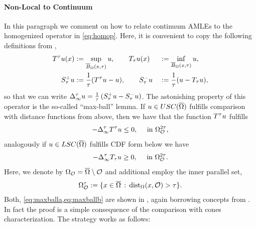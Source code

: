 \paragraph{Non-Local to Continuum}
%
In this paragraph we comment on how to relate continuum AMLEs to the homogenized operator in \cref{eq:homop}. Here, it is convenient to copy the following definitions from \cite{bungert2021uniform},
%
\begin{alignat}{2}
\label{eq:T-operators}
T^\tau u(x) &:= \sup_{\overline{B}_\Omega(x,\tau)} u, 
\qquad
T_\tau u(x) &&:= \inf_{\overline{B}_\Omega(x,\tau)} u,
\\
\label{eq:slopes}
S_\tau^+ u &:= \frac{1}{\tau}(T^\tau u - u),
\qquad
S_\tau^- u &&:= \frac{1}{\tau}(u-T_\tau u),
\end{alignat}
%
so that we can write $\Delta_\infty^\tau u = \frac{1}{\tau}\left(S^+_\tau u - S^-_\tau u\right)$. The astonishing property of this operator is the so-called \enquote{max-ball} lemma. If $u\in USC(\overline{\Omega})$ fulfills comparison with distance functions from above, then we have that the function $T^\tau u$ fulfills
%
\begin{align}\label{eq:maxballa}
-\Delta^\tau_\infty T^\tau u \leq 0, \quad\text{ in }
\Omega_{\mathcal{O}}^{2\tau},
\end{align}
%
analogously if $u\in LSC(\overline{\Omega})$ fulfills CDF form below we have
%
\begin{align}\label{eq:maxballb}
-\Delta^\tau_\infty T_\tau u \geq 0, \quad\text{ in }
\Omega_{\mathcal{O}}^{2\tau}.
\end{align}
%
%
Here, we denote by $\Omega_{\mathcal{O}} = \overline{\Omega}\setminus\mathcal{O}$ and additional employ the inner parallel set,
%
\begin{align}\label{eq:inner_parallel_set}
\Omega^{\tau}_{\mathcal{O}}:=\{x\in\overline{\Omega}\,:\, \operatorname{dist}_\Omega(x,\mathcal{O})>\tau\}.
\end{align}
%
Both, \cref{eq:maxballa,eq:maxballb} are shown in \cite[Lem. 4.6]{bungert2021uniform}, again borrowing concepts from \cite{armstrong2010easy}. In fact the proof is a simple consequence of the comparison with cones characterization. The strategy works as follows:
%
